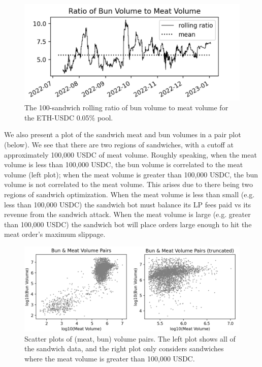         \begin{figure}
            \label{fig:meat-bun-ratio}
            \centering
            \includegraphics[scale=.4]{figs/bun-to-meat-ratio.png}
            \caption{The 100-sandwich rolling ratio of bun volume to meat volume for the ETH-USDC 0.05\% pool.}
        \end{figure}

        We also present a plot of the sandwich meat and bun volumes in a pair plot (below). We see that there are two regions of sandwiches, with a cutoff at approximately 100,000 USDC of meat volume. Roughly speaking, when the meat volume is less than 100,000 USDC, the bun volume is correlated to the meat volume (left plot); when the meat volume is greater than 100,000 USDC, the bun volume is not correlated to the meat volume. This arises due to there being two regions of sandwich optimization. When the meat volume is less than small (e.g. less than 100,000 USDC) the sandwich bot must balance its LP fees paid vs its revenue from the sandwich attack. When the meat volume is large (e.g. greater than 100,000 USDC) the sandwich bot will place orders large enough to hit the meat order's maximum slippage.

        \begin{figure}
            \label{fig:meat-bun-pairplots}
            \centering
            \includegraphics[scale=.43]{figs/meat-and-bun-pairwise-plot.png}
            \caption{Scatter plots of (meat, bun) volume pairs. The left plot shows all of the sandwich data, and the right plot only considers sandwiches where the meat volume is greater than 100,000 USDC.}
        \end{figure}


